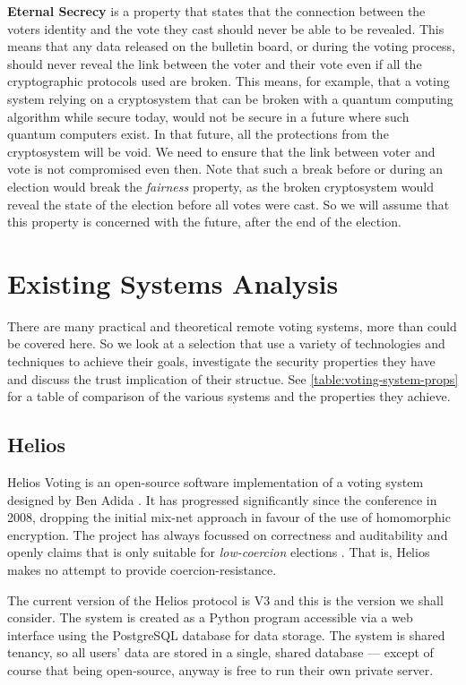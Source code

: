 \textbf{Eternal Secrecy} is a property that states that the connection between the voters identity and the vote they cast should never be able to be revealed. This means that any data released on the bulletin board, or during the voting process, should never reveal the link between the voter and their vote even if all the cryptographic protocols used are broken. This means, for example, that a voting system relying on a cryptosystem that can be broken with a quantum computing algorithm while secure today, would not be secure in a future where such quantum computers exist. In that future, all the protections from the cryptosystem will be void. We need to ensure that the link between voter and vote is not compromised even then. Note that such a break before or during an election would break the \emph{fairness} property, as the broken cryptosystem would reveal the state of the election before all votes were cast. So we will assume that this property is concerned with the future, after the end of the election.


\section{Existing Systems Analysis}
\label{ch:ev:existing}

There are many practical and theoretical remote voting systems, more than could be covered here. So we look at a selection that use a variety of technologies and techniques to achieve their goals, investigate the security properties they have and discuss the trust implication of their structue. See \autoref{table:voting-system-props} for a table of comparison of the various systems and the properties they achieve.

\subsection{Helios}

Helios Voting is an open-source software implementation of a voting system designed by Ben Adida \cite{adidaHeliosWebBasedOpenAudit2008}. It has progressed significantly since the conference in 2008, dropping the initial mix-net approach in favour of the use of homomorphic encryption. The project has always focussed on correctness and auditability and openly claims that is only suitable for \emph{low-coercion} elections \cite{HeliosVotingFAQ}. That is, Helios makes no attempt to provide coercion-resistance.

The current version of the Helios protocol is V3 and this is the version we shall consider. The system is created as a Python program accessible via a web interface using the PostgreSQL database for data storage. The system is shared tenancy, so all users' data are stored in a single, shared database --- except of course that being open-source, anyway is free to run their own private server.

